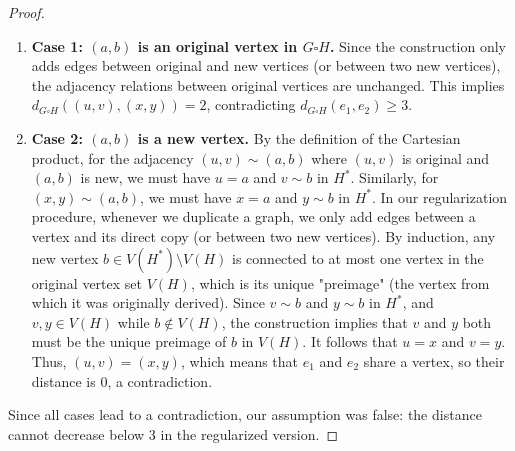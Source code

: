 \documentclass[10pt,a4paper]{amsart}
\begin{document}
\begin{proof}
    \begin{enumerate}
        \item \textbf{Case 1: $(a, b)$ is an original vertex in $G \square H$.} Since the construction only adds edges between original and new vertices (or between two new vertices), the adjacency relations between original vertices are unchanged. This implies $d_{G \square H}((u, v), (x, y)) = 2$, contradicting $d_{G \square H}(e_1, e_2) \geq 3$.
        
        \item \textbf{Case 2: $(a, b)$ is a new vertex.} By the definition of the Cartesian product, for the adjacency $(u, v) \sim (a, b)$ where $(u, v)$ is original and $(a, b)$ is new, we must have $u = a$ and $v \sim  b$ in $H^*$. Similarly, for $(x, y) \sim (a, b)$, we must have $x = a$ and $y \sim  b$ in $H^*$. In our regularization procedure, whenever we duplicate a graph, we only add edges between a vertex and its direct copy (or between two new vertices). By induction, any new vertex $b \in V(H^*) \setminus V(H)$ is connected to at most one vertex in the original vertex set $V(H)$, which is its unique "preimage" (the vertex from which it was originally derived). Since $v \sim  b$ and $y \sim  b$ in $H^*$, and $v, y \in V(H)$ while $b \notin V(H)$, the construction implies that $v$ and $y$ both must be the unique preimage of $b$ in $V(H)$. It follows that $u = x$ and $v = y$. Thus, $(u, v) = (x, y)$, which means that $e_1$ and $e_2$ share a vertex, so their distance is 0, a contradiction.
    \end{enumerate}    

    Since all cases lead to a contradiction, our assumption was false: the distance cannot decrease below 3 in the regularized version.
\end{proof}
\end{document}
